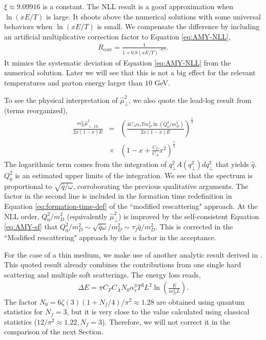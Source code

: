 \documentclass[aps, prc, reprint, amsmath, groupedaddress, nofootinbib]{revtex4-1}
\begin{document}
$\xi\approx9.09916$ is a constant. 
The NLL result is a good approximation when $\ln(xE/T)$ is large. 
It shoots above the numerical solutions with some universal behaviors when $\ln(xE/T)$ is small.
We compensate the difference by including an artificial multiplicative correction factor to Equation \ref{eq:AMY-NLL}, 
\begin{eqnarray}\label{eq:correction}
R_{\textrm{corr}} = \frac{1}{1+0.8\left(xE/T\right)^{-0.7}}.
\end{eqnarray}
It mimics the systematic deviation of Equation \ref{eq:AMY-NLL} from the numerical solution. 
Later we will see that this is not a big effect for the relevant temperatures and parton energy larger than $10$ GeV.

To see the physical interpretation of $\hat{\mu}_\perp^2$, we also quote the lead-log result from \cite{Arnold:2008zu} (terms reorganized),
\begin{eqnarray}\label{eq:AMY-LL}
\nonumber
\frac{m_D^2\hat{\mu}_{\perp, \textrm{LL}}^2}{2x(1-x)E} &=& 
\left(\frac{4C_A\alpha_s T m_D^2 \ln\left(Q_0^2/m_D^2\right)}{2x(1-x)E}\right)^{\frac{1}{2}}\\
&\times& \left(1-x+\frac{C_F}{C_A}x^2\right)^{\frac{1}{2}}
\end{eqnarray}
The logarithmic term comes from the integration of $q_\perp^2 A(q_\perp^2)dq_\perp^2$ that yields $\hat{q}$.
$Q_0^2$ is an estimated upper limits of the integration.
We see that the spectrum is proportional to $\sqrt{\hat{q}/\omega}$, corroborating the previous qualitative arguments.
The factor in the second line is included in the formation time redefinition in Equation \ref{eq:formation-time-def} of the ``modified rescattering" approach.
At the NLL order, $Q_0^2/m_D^2$ (equivalently $\hat{\mu}_\perp^2$) is improved by the self-consistent Equation \ref{eq:AMY-sf} that $Q_0^2/m_D^2 \sim \sqrt{\hat{q}\omega}/m_D^2\sim \tau_f\hat{q}/m_D^2$. 
This is corrected in the ``Modified rescattering" approach by the $u$ factor in the acceptance.

For the case of a thin medium, we make use of another analytic result derived in \cite{Arnold:2009mr}. 
This quoted result already combines the contributions from one single hard scattering and multiple soft scatterings.
The energy loss reads,
\begin{eqnarray}\label{eq:dE-thin}
\Delta E = \pi C_F C_A N_0 \alpha_s^3 T^3 L^2 \ln\left(\frac{E}{m_D^2 L}\right).
\end{eqnarray}
The factor $N_0 = 6\zeta(3)(1+N_f/4)/\pi^2 \approx 1.28$ 
are obtained using quantum statistics for $N_f=3$, but it is very close to the value calculated using classical statistics ($12/\pi^2 \approx 1.22, N_f=3$).
Therefore, we will not correct it in the comparison of the next Section.
\end{document}
